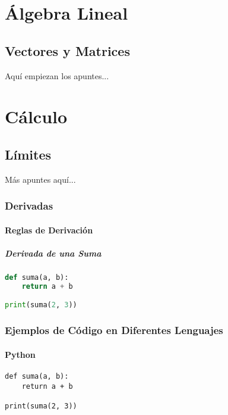 \documentclass[12pt,a4paper]{report}
\begin{document}
\tableofcontents
\thispagestyle{empty} %
\clearpage

\part{Álgebra Lineal}
\chapter{Vectores y Matrices}
Aquí empiezan los apuntes...

\part{Cálculo}
\chapter{Límites}
Más apuntes aquí...

\section{Derivadas}
\subsection{Reglas de Derivación}
\subsubsection{Derivada de una Suma}

\begin{lstlisting}[language=Python, caption={Ejemplo de código Python}]
def suma(a, b):
    return a + b

print(suma(2, 3))
\end{lstlisting}

\section{Ejemplos de Código en Diferentes Lenguajes}

\subsection{Python}
\begin{lstlisting}[style=style1, caption={Ejemplo de código Python}]
def suma(a, b):
    return a + b

print(suma(2, 3))
\end{lstlisting}
\end{document}
